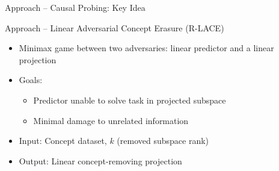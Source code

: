\documentclass[aspectratio=169]{beamer}
\begin{document}
\begin{frame}{Approach -- Causal Probing: Key Idea}
    \begin{figure}[!ht]
        \centering
    \end{figure}
\end{frame}

\begin{frame}{Approach -- Linear Adversarial Concept Erasure (R-LACE) \cite{rlace}}
    \begin{itemize}
        \item Minimax game between two adversaries: linear predictor and a linear projection
        \item Goals:
              \begin{itemize}
                  \item Predictor unable to solve task in projected subspace
                  \item Minimal damage to unrelated information
              \end{itemize}
        \item Input: Concept dataset, $k$ (removed subspace rank)
        \item Output: Linear concept-removing projection
    \end{itemize}
\end{frame}
\end{document}
